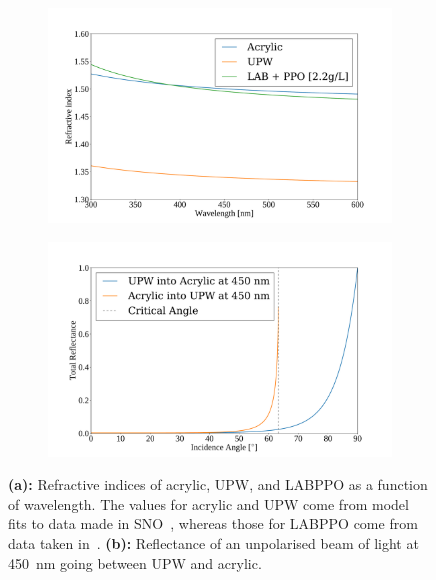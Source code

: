 \begin{figure}
    \centering
    \begin{subfigure}{0.48\textwidth}
        \centering
        \includegraphics[width=0.95\linewidth]{2_Detector/Figs/refractive_indices_plot.pdf}
        \caption{}
        \label{fig:ref_indices_snoplus}
    \end{subfigure}
    \begin{subfigure}{0.48\textwidth}
        \centering
        \includegraphics[width=0.95\linewidth]{2_Detector/Figs/reflectance_vs_angle_plot.pdf}
        \caption{}
        \label{fig:reflectance_vs_angle}
    \end{subfigure}
    \caption[Refractive indices of acrylic, UPW, and LABPPO as a function of wavelength; also reflectance as a function of incidence angle]
    {\textbf{(a):} Refractive indices of acrylic, UPW, and LABPPO as a function of wavelength. The values for acrylic and UPW come from model fits to data made in SNO~\cite{boardmanDetectionCherenkovRadiation1992,moffatOpticalCalibrationSudbury2001}, whereas those for LABPPO come from data taken in~\cite{tseungEllipsometricMeasurementsRefractive2011}. \textbf{(b):} Reflectance of an unpolarised beam of light at \SI{450}{\nm} going between UPW and acrylic.
    }
    \label{fig:ref_index_and_reflectance}
\end{figure}

